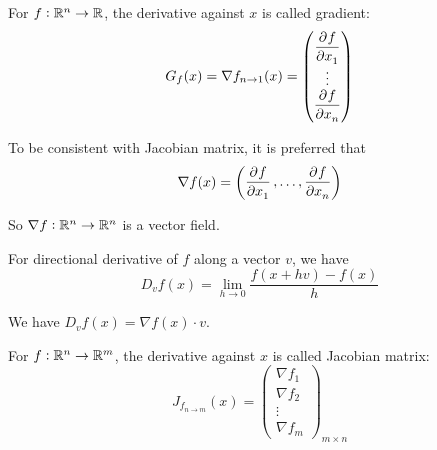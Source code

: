 \begin{definition}[Gradient]
    For $f: \mathbb{R}^n \rightarrow \mathbb{R}$, the derivative against $x$ is called gradient:
    \begin{equation}
    G_f (x) = \nabla f_{n \rightarrow 1} (x) = \begin{pmatrix}
        \dpd{f}{x_1} \\
        \vdots \\
        \dpd{f}{x_n}
    \end{pmatrix}
    \end{equation}
    
    To be consistent with Jacobian matrix, it is preferred that
    \begin{equation}
        \nabla f (x) = \begin{pmatrix}
            \dpd{f}{x_1}, \hdots, \dpd{f}{x_n}
        \end{pmatrix}
    \end{equation}
    
    So $\nabla f: \mathbb{R}^n \rightarrow \mathbb{R}^n$ is a vector field.
\end{definition}




\begin{example}    
For directional derivative of $f$ along a vector $v$, we have 
\begin{equation}
    D_v f(x) = \lim\limits_{h \rightarrow 0} \frac{f(x + hv) - f(x)}{h}
\end{equation}

We have $D_v f(x) = \nabla f(x) \cdot v$.
\end{example}

\begin{definition}
    For $f: \mathbb{R}^n \rightarrow \mathbb{R}^m$, the derivative against $x$ is called Jacobian matrix:
    \begin{equation}
        J_{f_{n \rightarrow m}} (x) = \begin{pmatrix}
            \nabla f_1 \\
            \nabla f_2 \\
            \vdots \\
            \nabla f_m
        \end{pmatrix}_{m \times n}
    \end{equation}
    
\end{definition}


